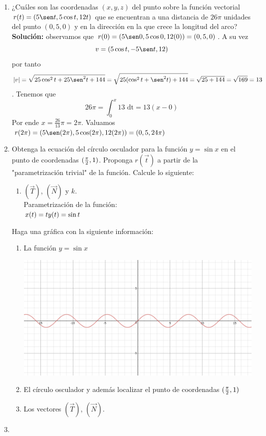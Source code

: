 \documentclass[10pt,letterpaper,fleqn]{article}
\begin{document}
\begin{enumerate}
        \item ¿Cuáles son las coordenadas $(x,y,z)$ del punto sobre la función vectorial $r(t)=(5\sen t,5\cos t, 12t)$
        que se encuentran a una distancia de $26\pi$ unidades del punto $(0,5,0)$ y en la dirección en la que crece
        la longitud del arco?\\
        \textbf{Solución:} observamos que $r(0) =(5\sen 0, 5\cos 0, 12(0)) = (0,5,0)$. A su vez $$v = (5\cos t,-5\sen t, 12)$$ 
        por tanto $$|v| = \sqrt{25\cos^2 t + 25\sen^2 t + 144} = \sqrt{25(\cos^2 t + \sen^2 t) + 144} = \sqrt{25+144} = \sqrt{169} = 13$$.
        Tenemos que $$26\pi = \int_{0}^{x}13 \text{ dt} = 13(x - 0)$$ Por ende $x = \frac{26}{13}\pi = 2\pi$. 
        Valuamos $r(2\pi) = (5\sen (2\pi), 5\cos (2\pi), 12(2\pi)) = (0,5,24\pi)$

        \item Obtenga la ecuación del círculo osculador para la función $y=\sin x$ en el punto de coordenadas $({\pi \over 2},1)$. Proponga $r(\overrightarrow{t})$ a partir de la "parametrización trivial" de la función. Calcule lo siguiente: 
        \begin{enumerate}
            \item $(\overrightarrow{T})$, $(\overrightarrow{N})$ y $k$.\\
            Parametrización de la función: \\
            $x(t) = t \\
             y(t) = \sin t$
        \end{enumerate}
        Haga una gráfica con la siguiente información:
        \begin{enumerate}
            \item La función $y=\sin x$ \\
            \begin{center}
                \includegraphics[scale=.3]{assets/img/ejercicio8(b).png}
            \end{center}
            \item El círculo osculador y además localizar el punto de coordenadas $({\pi \over 2},1)$
            \item Los vectores $(\overrightarrow{T})$, $(\overrightarrow{N})$.
        \end{enumerate}

        \item 


    \end{enumerate}
\end{document}
